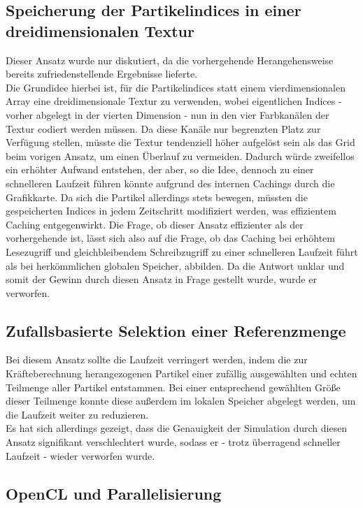 \subsection{Speicherung der Partikelindices in einer dreidimensionalen Textur}
Dieser Ansatz wurde nur diskutiert, da die vorhergehende Herangehensweise bereits zufriedenstellende Ergebnisse lieferte.\\
Die Grundidee hierbei ist, für die Partikelindices statt einem vierdimensionalen Array eine dreidimensionale Textur zu verwenden, wobei eigentlichen Indices - vorher abgelegt in der vierten Dimension - nun in den vier Farbkanälen der Textur codiert werden müssen. Da diese Kanäle nur begrenzten Platz zur Verfügung stellen, müsste die Textur tendenziell höher aufgelöst sein als das Grid beim vorigen Ansatz, um einen Überlauf zu vermeiden. Dadurch würde zweifellos ein erhöhter Aufwand entstehen, der aber, so die Idee, dennoch zu einer schnelleren Laufzeit führen könnte aufgrund des internen Cachings durch die Grafikkarte. Da sich die Partikel allerdings stets bewegen, müssten die gespeicherten Indices in jedem Zeitschritt modifiziert werden, was effizientem Caching entgegenwirkt. Die Frage, ob dieser Ansatz effizienter als der vorhergehende ist, lässt sich also auf die Frage, ob das Caching bei erhöhtem Lesezugriff und gleichbleibendem Schreibzugriff zu einer schnelleren Laufzeit führt als bei herkömmlichen globalen Speicher, abbilden. Da die Antwort unklar und somit der Gewinn durch diesen Ansatz in Frage gestellt wurde, wurde er verworfen.
\subsection{Zufallsbasierte Selektion einer Referenzmenge}
Bei diesem Ansatz sollte die Laufzeit verringert werden, indem die zur Kräfteberechnung herangezogenen Partikel einer zufällig ausgewählten und echten Teilmenge aller Partikel entstammen. Bei einer entsprechend gewählten Größe dieser Teilmenge konnte diese außerdem im lokalen Speicher abgelegt werden, um die Laufzeit weiter zu reduzieren.\\
Es hat sich allerdings gezeigt, dass die Genauigkeit der Simulation durch diesen Ansatz signifikant verschlechtert wurde, sodass er - trotz überragend schneller Laufzeit - wieder verworfen wurde.
\subsection{OpenCL und Parallelisierung}

